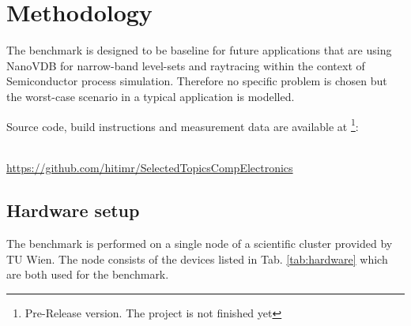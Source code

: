 \setcounter{section}{1}
\section{Methodology}






The benchmark is designed to be baseline for future applications that are using NanoVDB for narrow-band level-sets and raytracing within the context of Semiconductor process simulation.
Therefore no specific problem is chosen but the worst-case scenario in a typical application is modelled.


Source code, build instructions and measurement data are available at \footnote{Pre-Release version. The project is not finished yet}:
\\~\\
\centerline{\url{https://github.com/hitimr/SelectedTopicsCompElectronics}}


\subsection{Hardware setup}
The benchmark is performed on a single node of a scientific cluster provided by TU Wien.
The node consists of the devices listed in Tab. \ref{tab:hardware} which are both used for the benchmark.

